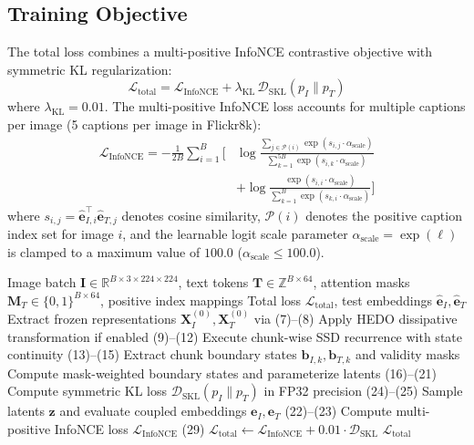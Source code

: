 \documentclass[journal]{IEEEtran}
\begin{document}
\subsection{Training Objective}
The total loss combines a multi-positive InfoNCE contrastive objective with symmetric KL regularization:
\begin{equation}
\mathcal{L}_{\text{total}} = \mathcal{L}_{\text{InfoNCE}} + \lambda_{\text{KL}} \, \mathcal{D}_{\text{SKL}}(p_I \parallel p_T)
\end{equation}
where $\lambda_{\text{KL}} = 0.01$. The multi-positive InfoNCE loss accounts for multiple captions per image (5 captions per image in Flickr8k):
\begin{align}
\mathcal{L}_{\text{InfoNCE}} = -\frac{1}{2B} \sum_{i=1}^B \Bigg[ &\log \frac{\sum_{j \in \mathcal{P}(i)} \exp(s_{i,j} \cdot \alpha_{\text{scale}})}{\sum_{k=1}^{5B} \exp(s_{i,k} \cdot \alpha_{\text{scale}})} \nonumber \\
&+ \log \frac{\exp(s_{i,i} \cdot \alpha_{\text{scale}})}{\sum_{k=1}^B \exp(s_{k,i} \cdot \alpha_{\text{scale}})} \Bigg]
\end{align}
where $s_{i,j} = \hat{\mathbf{e}}_{I, i}^\top \hat{\mathbf{e}}_{T, j}$ denotes cosine similarity, $\mathcal{P}(i)$ denotes the positive caption index set for image $i$, and the learnable logit scale parameter $\alpha_{\text{scale}} = \exp(\ell)$ is clamped to a maximum value of $100.0$ ($\alpha_{\text{scale}} \le 100.0$).

\begin{algorithm}[t]
\caption{HEDO-HVSC Forward Pass and Training Step}
\label{alg:hedo_hvsc}
\begin{algorithmic}[1]
\REQUIRE Image batch $\mathbf{I} \in \mathbb{R}^{B \times 3 \times 224 \times 224}$, text tokens $\mathbf{T} \in \mathbb{Z}^{B \times 64}$, attention masks $\mathbf{M}_T \in \{0, 1\}^{B \times 64}$, positive index mappings
\ENSURE Total loss $\mathcal{L}_{\text{total}}$, test embeddings $\hat{\mathbf{e}}_I, \hat{\mathbf{e}}_T$
\STATE Extract frozen representations $\mathbf{X}_I^{(0)}, \mathbf{X}_T^{(0)}$ via (7)--(8)
\STATE Apply HEDO dissipative transformation if enabled (9)--(12)
\STATE Execute chunk-wise SSD recurrence with state continuity (13)--(15)
\STATE Extract chunk boundary states $\mathbf{b}_{I, k}, \mathbf{b}_{T, k}$ and validity masks
\STATE Compute mask-weighted boundary states and parameterize latents (16)--(21)
\STATE Compute symmetric KL loss $\mathcal{D}_{\text{SKL}}(p_I \parallel p_T)$ in FP32 precision (24)--(25)
\STATE Sample latents $\mathbf{z}$ and evaluate coupled embeddings $\mathbf{e}_I, \mathbf{e}_T$ (22)--(23)
\STATE Compute multi-positive InfoNCE loss $\mathcal{L}_{\text{InfoNCE}}$ (29)
\STATE $\mathcal{L}_{\text{total}} \leftarrow \mathcal{L}_{\text{InfoNCE}} + 0.01 \cdot \mathcal{D}_{\text{SKL}}$
\RETURN $\mathcal{L}_{\text{total}}$
\end{algorithmic}
\end{algorithm}
\end{document}
